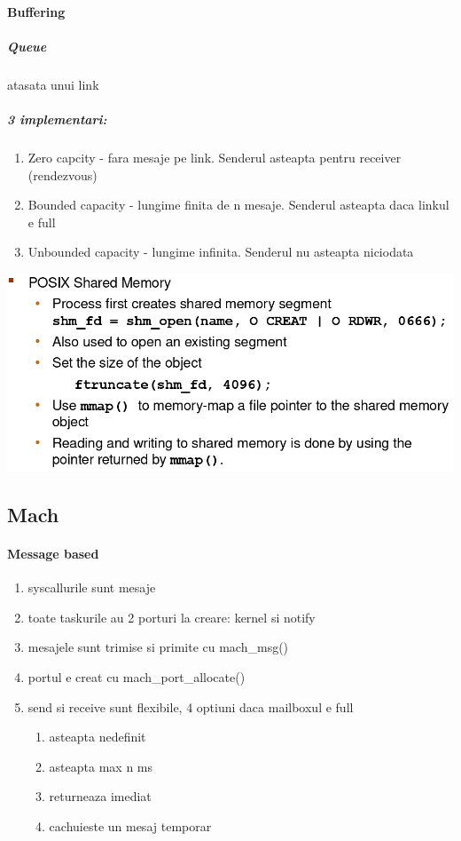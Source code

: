 \documentclass{article}
\begin{document}
\paragraph*{Buffering}
\subparagraph*{Queue} atasata unui link
\subparagraph*{3 implementari:}
\begin{enumerate}
    \item Zero capcity - fara mesaje pe link. Senderul asteapta pentru receiver (rendezvous)
    \item Bounded capacity - lungime finita de n mesaje. Senderul asteapta daca linkul e full
    \item Unbounded capacity - lungime infinita. Senderul nu asteapta niciodata
\end{enumerate}

\begin{center}
    \includegraphics[scale=0.3]{7_sharedmem.png}
\end{center}

\subsection*{Mach}
\paragraph*{Message based}
\begin{enumerate}
    \item syscallurile sunt mesaje
    \item toate taskurile au 2 porturi la creare: kernel si notify
    \item mesajele sunt trimise si primite cu mach\_msg()
    \item portul e creat cu mach\_port\_allocate()
    \item send si receive sunt flexibile, 4 optiuni daca mailboxul e full
          \begin{enumerate}
              \item asteapta nedefinit
              \item asteapta max n ms
              \item returneaza imediat
              \item cachuieste un mesaj temporar
          \end{enumerate}
\end{enumerate}
\end{document}
